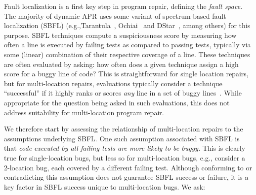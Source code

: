 \documentclass[10pt, conference]{IEEEtran}
\begin{document}
Fault localization is a first key step in program repair, defining the
\emph{fault space}. The majority of dynamic APR
uses some variant of spectrum-based fault localization (SBFL) (e.g.,Tarantula~\cite{tarantula},
Ochiai~\cite{ochiai} and DStar~\cite{wong2013dstar}, among others) for this purpose.
%
SBFL techniques compute a suspiciousness score by
measuring how often a line is executed by failing tests as compared to passing
tests, typically via some (linear) combination of their respective
coverage of a line. 
These techniques are often evaluated by asking: how often does a given technique assign a high 
score for a buggy line of code? This is straightforward for single location repairs, but for 
multi-location repairs, evaluations
typically consider a technique ``successful'' if it highly ranks or scores \emph{any} line in a
set of buggy lines~\cite{zou2019empirical,pearson2017evaluating,golagha2020can}.
While appropriate for the question being asked in such evaluations, this does not address
suitability for multi-location program repair.%

We therefore start by assessing the 
relationship of multi-location repairs to the assumptions underlying SBFL. 
One such assumption associated with SBFL is that 
\emph{code executed by all failing tests are more likely to be buggy.}
This is clearly true for single-location bugs, but less so for 
multi-location bugs, e.g., consider a 2-location bug, each covered by a
different failing test. Although conforming to or contradicting this assumption does
not guarantee SBFL success or failure, 
it is a key factor in SBFL success unique to multi-location bugs.  We ask:
\end{document}

